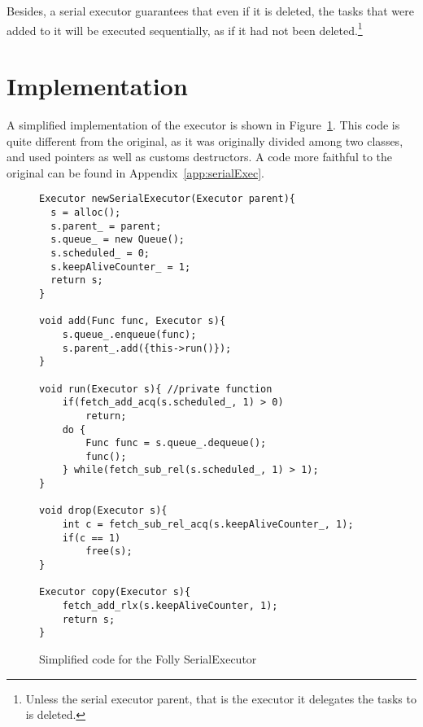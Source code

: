 Besides, a serial executor guarantees that even if it is deleted, the tasks that were added to it will be executed sequentially, as if it had not been deleted.\footnote{Unless the serial executor parent, that is the executor it delegates the tasks to is deleted.}



\section{Implementation}
A simplified implementation of the executor is shown in Figure~\ref{fig:simplSerialExec}. This code is quite different from the original, as it was originally divided among two classes, and used pointers as well as customs destructors. A code more faithful to the original can be found in Appendix~\ref{app:serialExec}. 

\begin{figure}
	\begin{lstlisting}
Executor newSerialExecutor(Executor parent){
  s = alloc();
  s.parent_ = parent;
  s.queue_ = new Queue();
  s.scheduled_ = 0;
  s.keepAliveCounter_ = 1;
  return s;
}

void add(Func func, Executor s){
	s.queue_.enqueue(func);
	s.parent_.add({this->run()});
}

void run(Executor s){ //private function
	if(fetch_add_acq(s.scheduled_, 1) > 0)
		return;
	do {
		Func func = s.queue_.dequeue();
		func();
	} while(fetch_sub_rel(s.scheduled_, 1) > 1);
}

void drop(Executor s){
	int c = fetch_sub_rel_acq(s.keepAliveCounter_, 1);
	if(c == 1)
		free(s);
}

Executor copy(Executor s){
	fetch_add_rlx(s.keepAliveCounter, 1);
	return s;
}
	\end{lstlisting}

		\caption{Simplified code for the Folly SerialExecutor}
\label{fig:simplSerialExec}
\end{figure}


